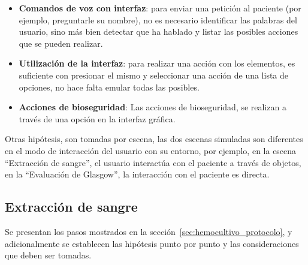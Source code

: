 \begin{itemize}

    \item \textbf{Comandos de voz con interfaz}: para enviar una petición al
        paciente (por ejemplo, preguntarle su nombre), no es necesario
        identificar las palabras del usuario, sino más bien detectar que ha
        hablado y listar las posibles acciones que se pueden realizar.

    \item \textbf{Utilización de la interfaz}: para realizar una acción con los
        elementos, es suficiente con presionar el mismo y seleccionar una acción
        de una lista de opciones, no hace falta emular todas las posibles.

    \item \textbf{Acciones de bioseguridad}: Las acciones de bioseguridad, se
        realizan a través de una opción en la interfaz gráfica.

\end{itemize}

Otras hipótesis, son tomadas por escena, las dos escenas simuladas son
diferentes en el modo de interacción del usuario con su entorno, por ejemplo, en
la escena \enquote{Extracción de sangre}, el usuario interactúa con el paciente
a través de objetos, en la \enquote{Evaluación de Glasgow}, la interacción con
el paciente es directa.

\subsection{Extracción de sangre}
\label{sec:hemocultivo_hipotesis}

Se presentan los pasos mostrados en la sección~\ref{sec:hemocultivo_protocolo},
y adicionalmente se establecen las hipótesis punto por punto y las
consideraciones que deben ser tomadas.

